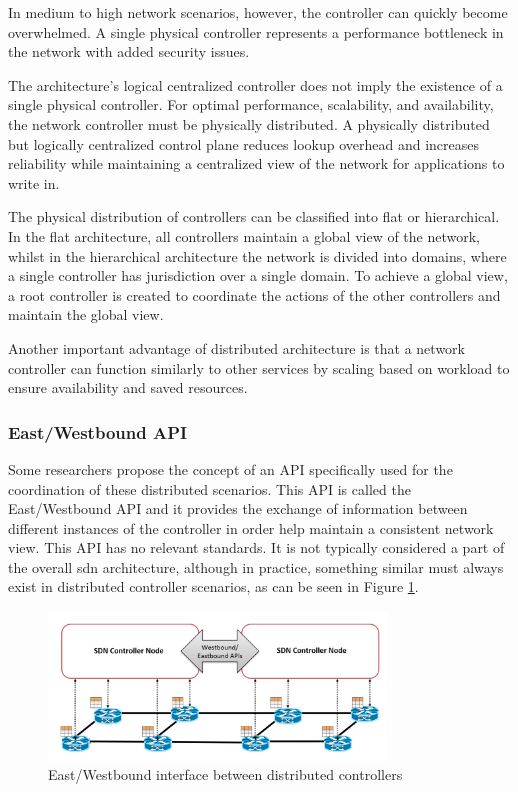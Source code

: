 In medium to high network scenarios, however, the controller can quickly become overwhelmed. A single physical controller represents a performance bottleneck in the network with added security issues\cite{zhu_sdn_2020}. 

The architecture's logical centralized controller does not imply the existence of a single physical controller. For optimal performance, scalability, and availability, the network controller must be physically distributed\cite{kreutz_software-defined_2015}. A physically distributed but logically centralized control plane reduces lookup overhead and increases reliability while maintaining a centralized view of the network for applications to write in\cite{nunes_survey_2014}. 

The physical distribution of controllers can be classified into flat or hierarchical\cite{zhu_sdn_2020}. In the flat architecture, all controllers maintain a global view of the network, whilst in the hierarchical architecture the network is divided into domains, where a single controller has jurisdiction over a single domain. To achieve a global view, a root controller is created to coordinate the actions of the other controllers and maintain the global view. 

Another important advantage of distributed architecture is that a network controller can function similarly to other services by scaling based on workload to ensure availability and saved resources\cite{peterson_software-defined_2021}. 

\subsubsection{East/Westbound API}
Some researchers propose the concept of an API specifically used for the coordination of these distributed scenarios\cite{kreutz_software-defined_2015}\cite{xia_survey_2015}\cite{thyagaturu_software_2016}\cite{latif_comprehensive_2020}\cite{zhu_sdn_2020}. This API is called the East/Westbound API and it provides the exchange of information between different instances of the controller in order help maintain a consistent network view. This API has no relevant standards. It is not typically considered a part of the overall \gls{sdn} architecture, although in practice, something similar must always exist in distributed controller scenarios, as can be seen in Figure \ref{fig:east_west}.

\begin{figure}
	\centering
	\includegraphics[width=0.8\textwidth]{Chapters/Figures/SDNs/east_west_api.png}
	\caption{East/Westbound interface between distributed controllers\cite{kreutz_software-defined_2015}}
	\label{fig:east_west}
\end{figure}



